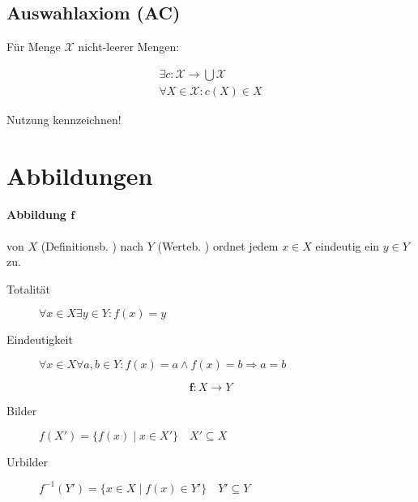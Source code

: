 \subsection{Auswahlaxiom (AC)}

Für Menge $\mathcal{X}$ nicht-leerer Mengen:

\begin{gather*}
  \exists c: \mathcal{X} \rightarrow \bigcup \mathcal{X} \\
  \forall X \in \mathcal{X}: c(X) \in X
\end{gather*}

Nutzung kennzeichnen!

\section{Abbildungen}

\paragraph{Abbildung $\mathbf{f}$}
von $X$ (Definitionsb. ) nach $Y$ (Werteb. ) ordnet jedem $x \in X$ eindeutig ein $y \in Y$ zu.

\begin{description}
  \item[Totalität] $\forall x \in X \exists y \in Y: f(x) = y$
  \item[Eindeutigkeit] $\forall x \in X \forall a, b \in Y: f(x) = a \land f(x) = b \Rightarrow a = b$
\end{description}

$$\mathbf{f}: X \rightarrow Y$$

\begin{description}
  \item [Bilder] $f(X') = \{ f(x) \mid x \in X' \} \quad X' \subseteq X$
  \item [Urbilder] $f^{-1}(Y') = \{ x \in X \mid f(x) \in Y' \} \quad Y' \subseteq Y$
\end{description}

